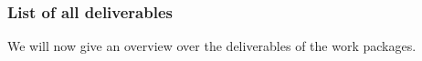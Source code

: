 \subsubsection*{List of all deliverables}\label{sec:deliverables}

We will now give an overview over the deliverables 
of the work packages. 



{\footnotesize{}}

